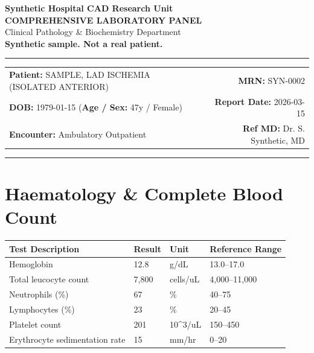 \documentclass[10pt,a4paper]{article}
\begin{document}
\begin{center}
  {\Large \textbf{Synthetic Hospital CAD Research Unit}}\\
  \vspace{2pt}
  {\normalsize \textbf{COMPREHENSIVE LABORATORY PANEL}}\\
  \vspace{1pt}
  {\footnotesize \textcolor{subtext}{Clinical Pathology \& Biochemistry Department}}\\
  \vspace{4pt}
  {\small \textbf{\textcolor{red!75!black}{Synthetic sample. Not a real patient.}}}\\
  \vspace{3pt}
  \textcolor{linecolor}{\rule{\textwidth}{0.8pt}}
\end{center}

\vspace{2pt}

\noindent
\begin{tabular*}{\textwidth}{@{} l @{\extracolsep{\fill}} r @{}}
  \textbf{Patient:} SAMPLE, LAD ISCHEMIA (ISOLATED ANTERIOR) & \textbf{MRN:} SYN-0002 \\
  \textbf{DOB:} 1979-01-15 \quad (\textbf{Age / Sex:} 47y / Female) & \textbf{Report Date:} 2026-03-15 \\
  \textbf{Encounter:} Ambulatory Outpatient & \textbf{Ref MD:} Dr. S. Synthetic, MD \\
\end{tabular*}

\vspace{2pt}
\noindent\textcolor{linecolor}{\rule{\textwidth}{0.4pt}}
\vspace{6pt}


\section*{Haematology \& Complete Blood Count}

\begin{tabular}{@{} p{6.4cm} p{2.5cm} p{2.5cm} p{3.1cm} @{}}
  \toprule
  \textbf{Test Description} & \textbf{Result} & \textbf{Unit} & \textbf{Reference Range} \\
  \midrule
  Hemoglobin & 12.8 & g/dL & 13.0--17.0 \\
  Total leucocyte count & 7,800 & cells/uL & 4,000--11,000 \\
  Neutrophils (\%) & 67 & \% & 40--75 \\
  Lymphocytes (\%) & 23 & \% & 20--45 \\
  Platelet count & 201 & 10\textasciicircum 3/uL & 150--450 \\
  Erythrocyte sedimentation rate & 15 & mm/hr & 0--20 \\
  \bottomrule
\end{tabular}
\end{document}
